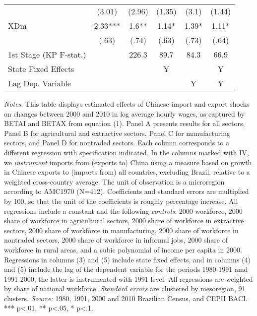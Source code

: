 \begin{center}
\begin{table}[h!]
\begin{center}
\begin{centering}
\begin{tabular}{lccccc}
 & {\scriptsize{}(3.01)} & {\scriptsize{}(2.96)} & {\scriptsize{}(1.35)} & {\scriptsize{}(3.1)} & {\scriptsize{}(1.44)}\tabularnewline
{\footnotesize{}XDm} & {\footnotesize{} 2.33***} & {\footnotesize{} 1.6**} & {\footnotesize{} 1.14*} & {\footnotesize{} 1.39*} & {\footnotesize{} 1.11*}\tabularnewline
 & {\scriptsize{}(.63)} & {\scriptsize{}(.74)} & {\scriptsize{}(.63)} & {\scriptsize{}(.73)} & {\scriptsize{}(.64)}\tabularnewline
{\scriptsize{}1st Stage (KP F-stat.)} &  & {\scriptsize{} 226.3} & {\scriptsize{} 89.7} & {\scriptsize{} 84.3} & {\scriptsize{} 66.9}\tabularnewline
\hline 
{\scriptsize{}State Fixed Effects} &  &  & {\scriptsize{}Y} &  & {\scriptsize{}Y}\tabularnewline
{\scriptsize{}Lag Dep. Variable} &  &  &  & {\scriptsize{}Y} & {\scriptsize{}Y}\tabularnewline
\hline 
\end{tabular}
\par\end{centering}
\medskip
\end{center}
\footnotesize
\emph{Notes}. This table displays estimated effects of Chinese import and export shocks on changes between 2000 and 2010 in log average hourly wages, as captured by BETAI and BETAX from equation (1). Panel A presents results for all sectors, Panel B for agricultural and extractive sectors, Panel C for manufacturing sectors, and Panel D for nontraded sectors. Each column corresponds to a different regression with specification indicated. In the columns marked with IV, we \emph{instrument} imports from (exports to) China using a measure based on growth in Chinese exports to (imports from) all countries, excluding Brazil, relative to a weighted cross-country average. The unit of observation is a microregion according to AMC1970 (N=412). Coefficients and standard errors are multiplied by 100, so that the unit of the coefficients is roughly percentage increase. All regressions include a constant and the following \emph{controls}: 2000 workforce, 2000 share of workforce in agricultural sectors, 2000 share of workforce in extractive sectors, 2000 share of workforce in manufacturing, 2000 share of workforce in nontraded sectors, 2000 share of workforce in informal jobs, 2000 share of workforce in rural areas, and a cubic polynomial of income per capita in 2000. Regressions in columns (3) and (5) include state fixed effects, and in columns (4) and (5) include the lag of the dependent variable for the periods 1980-1991 amd 1991-2000, the latter is instrumented with 1991 level. All regressions are weighted by share of national workforce.
 \emph{Standard errors} are clustered by mesoregion, 91 clusters. \emph{Source:} 1980, 1991, 2000 and 2010 Brazilian Census, and CEPII BACI. *** p<.01, ** p<.05, * p<.1.
\end{table}
\par \end{center}
